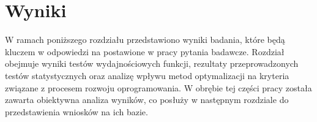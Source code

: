 \chapter{Wyniki}\label{chapter:wyniki}

W ramach poniższego rozdziału przedstawiono wyniki badania, które będą kluczem w odpowiedzi na postawione w pracy pytania badawcze.
Rozdział obejmuje wyniki testów wydajnościowych funkcji, rezultaty przeprowadzonych testów statystycznych oraz analizę wpływu metod optymalizacji na kryteria związane z procesem rozwoju oprogramowania.
W obrębie tej części pracy została zawarta obiektywna analiza wyników, co posłuży w następnym rozdziale do przedstawienia wniosków na ich bazie.










